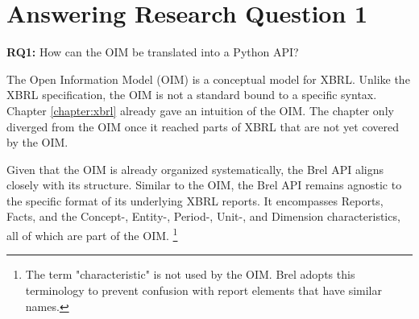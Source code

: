 \section{Answering Research Question 1}
\label{sec:answer_research_question_1}

\begin{displayquote}
    \textbf{RQ1:} How can the OIM be translated into a Python API?
\end{displayquote}

The Open Information Model (OIM) is a conceptual model for XBRL.\cite{oim}
Unlike the XBRL specification, the OIM is not a standard bound to a specific syntax.
Chapter \ref{chapter:xbrl} already gave an intuition of the OIM.
The chapter only diverged from the OIM once it reached parts of XBRL that are not yet covered by the OIM.

Given that the OIM is already organized systematically, the Brel API aligns closely with its structure. 
Similar to the OIM, the Brel API remains agnostic to the specific format of its underlying XBRL reports. 
It encompasses Reports, Facts, and the Concept-, Entity-, Period-, Unit-, and Dimension characteristics, 
all of which are part of the OIM. 
\footnote{The term "characteristic" is not used by the OIM. Brel adopts this terminology to prevent confusion with report elements that have similar names.}

